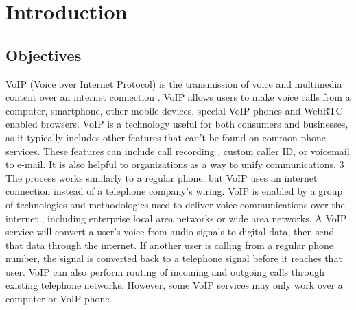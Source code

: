 \chapter{Introduction}
\justify
\quad 


\section{Objectives}
\justify 
\quad 
VoIP (Voice over Internet Protocol) is the transmission of voice and multimedia
content over an internet connection . VoIP allows users to make voice calls from a computer, smartphone, other mobile devices, special VoIP phones and WebRTC-enabled browsers. VoIP is a technology useful for both consumers and businesses, as it typically includes other features that can't be found on common phone services. These features can include call recording , custom caller ID, or voicemail to e-mail. It is also helpful to organizations as a way to unify communications.
3 The process works similarly to a regular phone, but VoIP uses an internet connection instead of a telephone company's wiring. VoIP is enabled by a group of technologies and methodologies used to deliver voice communications over the internet , including enterprise local area networks or wide area networks.
A VoIP service will convert a user's voice from audio signals to digital data, then send that data through the internet. If another user is calling from a regular phone number, the signal is converted back to a telephone signal before it reaches that user. VoIP can also perform routing of incoming and outgoing calls through existing telephone networks. However, some VoIP services may only work over a computer or VoIP phone.


